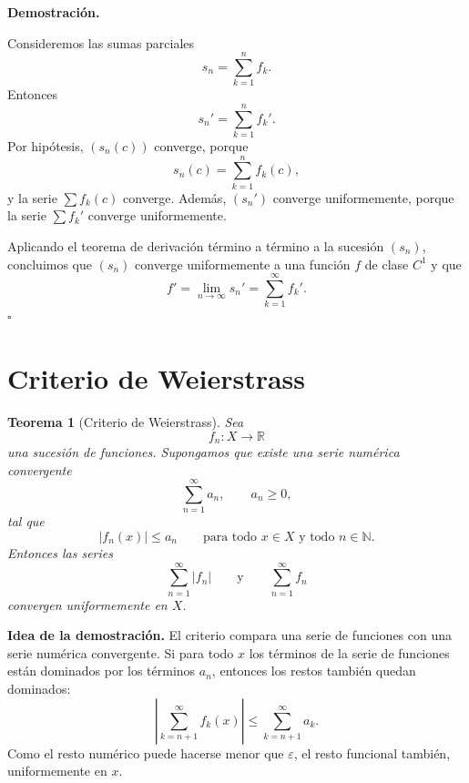 \documentclass[11pt,a4paper,openany]{book}
\theoremstyle{definition}
\theoremstyle{plain}
\newtheorem{teorema}{Teorema}[chapter]
\theoremstyle{remark}
\renewenvironment{proof}[1][\textbf{Demostración.}]{%
  \par\noindent #1\ \normalfont
}{\hfill$\square$\par\medskip}
\newenvironment{idea}
{\begin{comentariolibro}\textbf{Idea de la demostración. }\normalfont}
{\end{comentariolibro}}
\newcommand{\R}{\mathbb{R}}
\newcommand{\N}{\mathbb{N}}
\begin{document}
\begin{proof}
Consideremos las sumas parciales
\[
    s_n=\sum_{k=1}^n f_k.
\]
Entonces
\[
    s_n'=\sum_{k=1}^n f_k'.
\]
Por hipótesis, $(s_n(c))$ converge, porque
\[
    s_n(c)=\sum_{k=1}^n f_k(c),
\]
y la serie $\sum f_k(c)$ converge. Además, $(s_n')$ converge uniformemente,
porque la serie $\sum f_k'$ converge uniformemente.

Aplicando el teorema de derivación término a término a la sucesión $(s_n)$,
concluimos que $(s_n)$ converge uniformemente a una función $f$ de clase $C^1$
y que
\[
    f'
    =
    \lim_{n\to\infty}s_n'
    =
    \sum_{k=1}^{\infty}f_k'.
\]
\end{proof}

\section{Criterio de Weierstrass}

\begin{grisplano}
\begin{teorema}[Criterio de Weierstrass]
Sea
\[
    f_n:X\to\R
\]
una sucesión de funciones. Supongamos que existe una serie numérica convergente
\[
    \sum_{n=1}^{\infty} a_n,
    \qquad a_n\geq 0,
\]
tal que
\[
    |f_n(x)|\leq a_n
    \qquad
    \text{para todo }x\in X
    \text{ y todo }n\in\N.
\]
Entonces las series
\[
    \sum_{n=1}^{\infty}|f_n|
    \qquad\text{y}\qquad
    \sum_{n=1}^{\infty}f_n
\]
convergen uniformemente en $X$.
\end{teorema}
\end{grisplano}

\begin{idea}
El criterio compara una serie de funciones con una serie numérica convergente.
Si para todo $x$ los términos de la serie de funciones están dominados por los
términos $a_n$, entonces los restos también quedan dominados:
\[
    \left|\sum_{k=n+1}^{\infty} f_k(x)\right|
    \leq
    \sum_{k=n+1}^{\infty} a_k.
\]
Como el resto numérico puede hacerse menor que $\varepsilon$, el resto funcional
también, uniformemente en $x$.
\end{idea}
\end{document}
